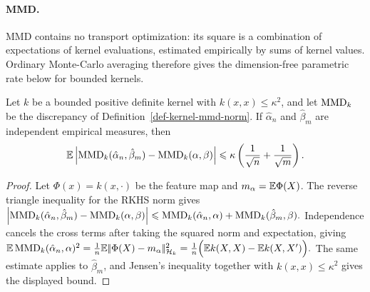 \paragraph{MMD.}
MMD contains no transport optimization: its square is a combination of expectations of kernel evaluations, estimated empirically by sums of kernel values. Ordinary Monte-Carlo averaging therefore gives the dimension-free parametric rate below for bounded kernels.

\begin{prop}\label{prop-mmd-sample-rate}
Let $k$ be a bounded positive definite kernel with $k(x,x)\leq\kappa^2$, and let $\operatorname{MMD}_k$ be the discrepancy of Definition~\ref{def-kernel-mmd-norm}. If $\hat\alpha_n$ and $\hat\beta_m$ are independent empirical measures, then
\[
\mathbb{E}\left\lvert\operatorname{MMD}_k(\hat\alpha_n,\hat\beta_m)-\operatorname{MMD}_k(\alpha,\beta)\right\rvert
\leqslant
\kappa\left(\frac1{\sqrt n}+\frac1{\sqrt m}\right).
\]
\end{prop}
\begin{proof}
Let $\Phi(x)=k(x,\cdot)$ be the feature map and $m_\alpha=\mathbb{E}\Phi(X)$. The reverse triangle inequality for the RKHS norm gives
\(\left\lvert\operatorname{MMD}_k(\hat\alpha_n,\hat\beta_m)-\operatorname{MMD}_k(\alpha,\beta)\right\rvert \leqslant \operatorname{MMD}_k(\hat\alpha_n,\alpha)+\operatorname{MMD}_k(\hat\beta_m,\beta).\)
Independence cancels the cross terms after taking the squared norm and expectation, giving
\(\mathbb{E}\operatorname{MMD}_k(\hat\alpha_n,\alpha)^2 =\frac1n\mathbb{E}|\!| \Phi(X)-m_\alpha |\!|_{\mathcal{H}_k}^2 =\frac{1}{n}\Big(\mathbb{E} k(X,X)-\mathbb{E} k(X,X')\Big).\)
The same estimate applies to $\hat\beta_m$, and Jensen's inequality together with $k(x,x)\leq\kappa^2$ gives the displayed bound.
\end{proof}
